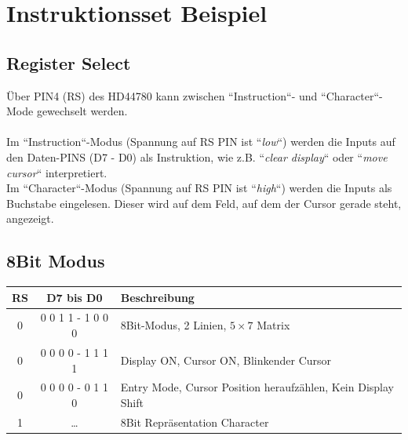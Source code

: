 \documentclass[a4paper,11pt]{article}
\begin{document}
\section*{Instruktionsset Beispiel}
\subsection*{Register Select}
Über PIN4 (RS) des HD44780 kann zwischen ``Instruction``- und ``Character``-Mode gewechselt werden.\\\\
Im ``Instruction``-Modus (Spannung auf RS PIN ist ``\textit{low}``) werden die Inputs auf den Daten-PINS (D7 - D0) als Instruktion, wie z.B. ``\textit{clear display}`` oder ``\textit{move cursor}`` interpretiert.\\
Im ``Character``-Modus (Spannung auf RS PIN ist ``\textit{high}``) werden die Inputs als Buchstabe eingelesen. Dieser wird auf dem Feld, auf dem der Cursor gerade steht, angezeigt.

\subsection*{8Bit Modus}
\begin{tabular}{| c | c | l |}
	\hline
	\textbf{RS} & \textbf{D7 bis D0} & \textbf{Beschreibung} \\\hline
	0 & 0 0 1 1 - 1 0 0 0 & 8Bit-Modus, 2 Linien, $5 \times 7$ Matrix \\\hline
	0 & 0 0 0 0 - 1 1 1 1 & Display ON, Cursor ON, Blinkender Cursor \\\hline
	0 & 0 0 0 0 - 0 1 1 0 & Entry Mode, Cursor Position heraufzählen, Kein Display Shift\\\hline
	1 & \ldots & 8Bit Repräsentation Character\\\hline
\end{tabular}
\end{document}
